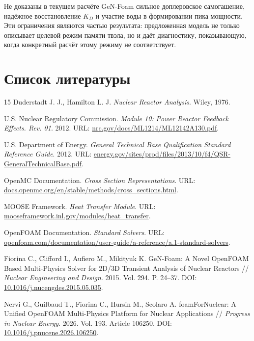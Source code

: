\documentclass[12pt]{article}
\begin{document}
Не доказаны в текущем расчёте GeN-Foam сильное доплеровское самогашение, надёжное восстановление \(K_D\) и участие воды в формировании пика мощности. Эти ограничения являются частью результата: предложенная модель не только описывает целевой режим памяти твэла, но и даёт диагностику, показывающую, когда конкретный расчёт этому режиму не соответствует.

\newpage
\section{Список литературы}
\begin{thebibliography}{15}
    Duderstadt J. J., Hamilton L. J. \textit{Nuclear Reactor Analysis}. Wiley, 1976.

    U.S. Nuclear Regulatory Commission. \textit{Module 10: Power Reactor Feedback Effects. Rev. 01}. 2012. URL: \href{https://www.nrc.gov/docs/ML1214/ML12142A130.pdf}{nrc.gov/docs/ML1214/ML12142A130.pdf}.

    U.S. Department of Energy. \textit{General Technical Base Qualification Standard Reference Guide}. 2012. URL: \href{https://www.energy.gov/sites/prod/files/2013/10/f4/QSR-GeneralTechnicalBase.pdf}{energy.gov/sites/prod/files/2013/10/f4/QSR-GeneralTechnicalBase.pdf}.

    OpenMC Documentation. \textit{Cross Section Representations}. URL: \href{https://docs.openmc.org/en/stable/methods/cross_sections.html}{docs.openmc.org/en/stable/methods/cross\_sections.html}.

    MOOSE Framework. \textit{Heat Transfer Module}. URL: \href{https://mooseframework.inl.gov/modules/heat_transfer/}{mooseframework.inl.gov/modules/heat\_transfer}.

    OpenFOAM Documentation. \textit{Standard Solvers}. URL: \href{https://www.openfoam.com/documentation/user-guide/a-reference/a.1-standard-solvers}{openfoam.com/documentation/user-guide/a-reference/a.1-standard-solvers}.

    Fiorina C., Clifford I., Aufiero M., Mikityuk K. GeN-Foam: A Novel OpenFOAM Based Multi-Physics Solver for 2D/3D Transient Analysis of Nuclear Reactors // \textit{Nuclear Engineering and Design}. 2015. Vol. 294. P. 24--37. DOI: \href{https://doi.org/10.1016/j.nucengdes.2015.05.035}{10.1016/j.nucengdes.2015.05.035}.

    Nervi G., Guilbaud T., Fiorina C., Hursin M., Scolaro A. foamForNuclear: A Unified OpenFOAM Multi-Physics Platform for Nuclear Applications // \textit{Progress in Nuclear Energy}. 2026. Vol. 193. Article 106250. DOI: \href{https://doi.org/10.1016/j.pnucene.2026.106250}{10.1016/j.pnucene.2026.106250}.
\end{thebibliography}
\end{document}
